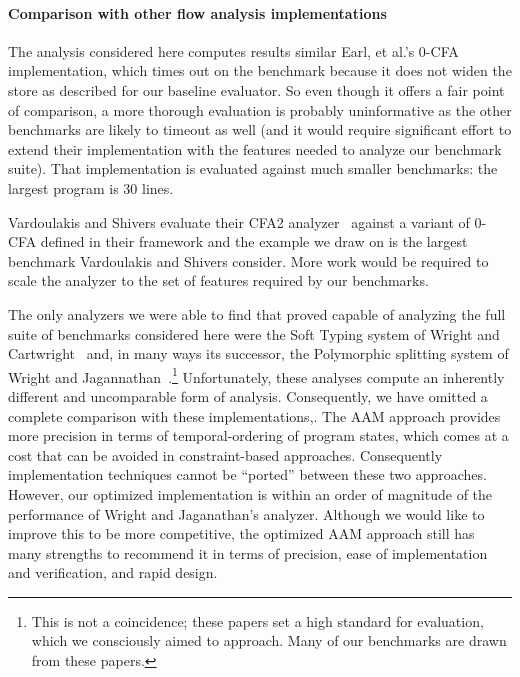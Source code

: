 \documentclass[preprint,onecolumn,9pt]{sigplanconf} %
\begin{document}
\paragraph{Comparison with other flow analysis implementations}

The analysis considered here computes results similar Earl, et al.'s
0-CFA implementation, which times out on the \Church{} benchmark
because it does not widen the store as described for our baseline
evaluator.  So even though it offers a fair point of comparison, a
more thorough evaluation is probably uninformative as the other
benchmarks are likely to timeout as well (and it would require
significant effort to extend their implementation with the features
needed to analyze our benchmark suite).  That implementation is
evaluated against much smaller benchmarks: the largest program is 30
lines.

Vardoulakis and Shivers evaluate their CFA2
analyzer~\cite{dvanhorn:Vardoulakis2011CFA2} against a variant of
0-CFA defined in their framework and the example we draw on is the
largest benchmark Vardoulakis and Shivers consider.  More work would
be required to scale the analyzer to the set of features required by
our benchmarks.

The only analyzers we were able to find that proved capable of
analyzing the full suite of benchmarks considered here were the Soft
Typing system of Wright and
Cartwright~\cite{dvanhorn:Wright1997Practical} and, in many ways its
successor, the Polymorphic splitting system of Wright and
Jagannathan~\cite{dvanhorn:wright-jagannathan-toplas98}.\footnote{This
  is not a coincidence; these papers set a high standard for
  evaluation, which we consciously aimed to approach.  Many of our
  benchmarks are drawn from these papers.}  Unfortunately, these
analyses compute an inherently different and uncomparable form of
analysis.  Consequently, we have omitted a complete comparison with
these implementations,.  The AAM approach provides more precision in
terms of temporal-ordering of program states, which comes at a cost
that can be avoided in constraint-based approaches.  Consequently
implementation techniques cannot be ``ported'' between these two
approaches.  However, our optimized implementation is within an order
of magnitude of the performance of Wright and Jaganathan's analyzer.
Although we would like to improve this to be more competitive, the
optimized AAM approach still has many strengths to recommend it in
terms of precision, ease of implementation and verification, and rapid
design.
\end{document}
